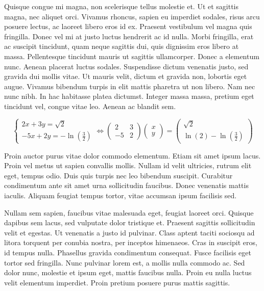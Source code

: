 \documentclass[a4paper,12pt]{report}
\begin{document}
Quisque congue mi magna, non scelerisque tellus molestie et. Ut et sagittis magna, nec aliquet orci. Vivamus rhoncus, sapien eu imperdiet sodales, risus arcu posuere lectus, ac laoreet libero eros id ex. Praesent vestibulum vel magna quis fringilla. Donec vel mi at justo luctus hendrerit ac id nulla. Morbi fringilla, erat ac suscipit tincidunt, quam neque sagittis dui, quis dignissim eros libero at massa. Pellentesque tincidunt mauris ut sagittis ullamcorper. Donec a elementum nunc. Aenean placerat luctus sodales. Suspendisse dictum venenatis justo, sed gravida dui mollis vitae. Ut mauris velit, dictum et gravida non, lobortis eget augue. Vivamus bibendum turpis in elit mattis pharetra ut non libero. Nam nec nunc nibh. In hac habitasse platea dictumst. Integer massa massa, pretium eget tincidunt vel, congue vitae leo. Aenean ac blandit sem.

\begin{equation*}
\begin{cases}
2x + 3y = \sqrt{2} \\
-5x + 2y = -\ln\left(\frac{3}{2}\right)
\end{cases}
\iff
\begin{pmatrix}
2 & 3 \\
-5 & 2
\end{pmatrix}
\begin{pmatrix}
x \\
y
\end{pmatrix}
=
\begin{pmatrix}
\sqrt{2} \\
\ln(2) - \ln\left(\frac{3}{2}\right)
\end{pmatrix}
\end{equation*}


Proin auctor purus vitae dolor commodo elementum. Etiam sit amet ipsum lacus. Proin vel metus ut sapien convallis mollis. Nullam id velit ultricies, rutrum elit eget, tempus odio. Duis quis turpis nec leo bibendum suscipit. Curabitur condimentum ante sit amet urna sollicitudin faucibus. Donec venenatis mattis iaculis. Aliquam feugiat tempus tortor, vitae accumsan ipsum facilisis sed.

Nullam sem sapien, faucibus vitae malesuada eget, feugiat laoreet orci. Quisque dapibus sem lacus, sed vulputate dolor tristique et. Praesent sagittis sollicitudin velit et egestas. Ut venenatis a justo id pulvinar. Class aptent taciti sociosqu ad litora torquent per conubia nostra, per inceptos himenaeos. Cras in suscipit eros, id tempus nulla. Phasellus gravida condimentum consequat. Fusce facilisis eget tortor sed fringilla. Nunc pulvinar lorem est, a mollis nulla commodo ac. Sed dolor nunc, molestie et ipsum eget, mattis faucibus nulla. Proin eu nulla luctus velit elementum imperdiet. Proin pretium posuere purus mattis sagittis.
\end{document}
